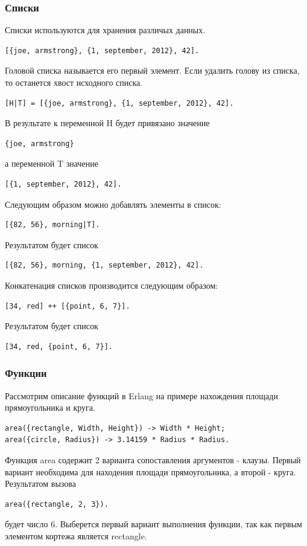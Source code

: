\subsubsection{Списки} 
Списки используются для хранения различых данных.
\begin{lstlisting}
[{joe, armstrong}, {1, september, 2012}, 42].
\end{lstlisting}
Головой списка называется его первый элемент. Если удалить голову из списка,
то останется хвост исходного списка. 
\begin{lstlisting}
[H|T] = [{joe, armstrong}, {1, september, 2012}, 42].
\end{lstlisting}
В результате к переменной H будет привязано значение
\begin{lstlisting} 
{joe, armstrong}
\end{lstlisting}
а переменной T значение 
\begin{lstlisting}
[{1, september, 2012}, 42].
\end{lstlisting}

Следующим образом можно добавлять элементы в список:
\begin{lstlisting}
[{82, 56}, morning|T].
\end{lstlisting}
Результатом будет список
\begin{lstlisting} 
[{82, 56}, morning, {1, september, 2012}, 42].
\end{lstlisting}

Конкатенация списков производится следующим образом:
\begin{lstlisting}
[34, red] ++ [{point, 6, 7}].
\end{lstlisting}
Результатом будет список 
\begin{lstlisting}
[34, red, {point, 6, 7}].
\end{lstlisting}


\subsubsection{Функции}
Рассмотрим описание функций в Erlang на примере нахождения площади прямоугольника и круга.
\begin{lstlisting}
area({rectangle, Width, Height}) -> Width * Height;
area({circle, Radius}) -> 3.14159 * Radius * Radius.
\end{lstlisting}
Функция area содержит 2 варианта сопоставления аргументов - клаузы. 
Первый вариант необходима для находения площади прямоугольника, а
второй - круга. 
Результатом вызова 
\begin{lstlisting}
area({rectangle, 2, 3}).
\end{lstlisting}
будет число 6. Выберется первый вариант выполнения функции, так как первым элементом 
кортежа является rectangle.



